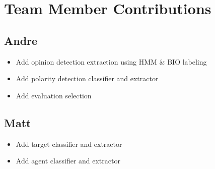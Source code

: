 \documentclass{article}
\begin{document}
    \section{Team Member Contributions}

        \subsection{Andre}

            \begin{itemize}
                \item Add opinion detection extraction using HMM \& BIO labeling
                \item Add polarity detection classifier and extractor
                \item Add evaluation selection
            \end{itemize}

        \subsection{Matt}

            \begin{itemize}
                \item Add target classifier and extractor
                \item Add agent classifier and extractor
            \end{itemize}
\end{document}
